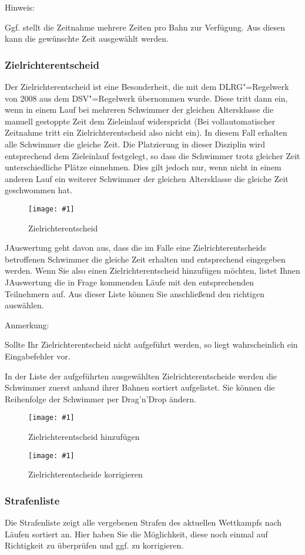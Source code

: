 \documentclass[11pt,a4paper,twoside,ngerman]{article}
\newcommand{\hsmimage}[3]{\begin{figure}[!ht]\centering\texttt{[image: \#1]}\caption{#3}\end{figure}}
\begin{document}
\begin{bfseries}Hinweis:\end{bfseries} Ggf. stellt die Zeitnahme mehrere Zeiten pro Bahn zur Verfügung. Aus diesen kann die gewünschte Zeit ausgewählt werden.


\subsubsection*{Zielrichterentscheid}
\label{lbl:jauswertungmenus:zielrichterentscheid}Der Zielrichterentscheid ist eine Besonderheit, die mit dem DLRG"=Regelwerk von 2008 aus dem DSV"=Regelwerk übernommen wurde. Diese tritt dann ein, wenn in einem Lauf bei mehreren Schwimmer der gleichen Altersklasse die manuell gestoppte Zeit dem Zieleinlauf widerspricht (Bei vollautomatischer Zeitnahme tritt ein Zielrichterentscheid also nicht ein). In diesem Fall erhalten alle Schwimmer die gleiche Zeit. Die Platzierung in dieser Disziplin wird entsprechend dem Zieleinlauf festgelegt, so dass die Schwimmer trotz gleicher Zeit unterschiedliche Plätze einnehmen. Dies gilt jedoch nur, wenn nicht in einem anderen Lauf ein weiterer Schwimmer der gleichen Altersklasse die gleiche Zeit geschwommen hat.


\hsmimage{pics/zielrichterentscheid}{.76\textwidth}{Zielrichterentscheid}
JAuswertung geht davon aus, dass die im Falle eine Zielrichterentscheids betroffenen Schwimmer die gleiche Zeit erhalten und entsprechend eingegeben werden. Wenn Sie also einen Zielrichterentscheid hinzufügen möchten, listet Ihnen JAuswertung die in Frage kommenden Läufe mit den entsprechenden Teilnehmern auf. Aus dieser Liste können Sie anschließend den richtigen auswählen. 

\begin{bfseries}Anmerkung:\end{bfseries} Sollte Ihr Zielrichterentscheid nicht aufgeführt werden, so liegt wahrscheinlich ein Eingabefehler vor.

In der Liste der aufgeführten ausgewählten Zielrichterentscheide werden die Schwimmer zuerst anhand ihrer Bahnen sortiert aufgelistet. Sie können die Reihenfolge der Schwimmer per Drag'n'Drop ändern.


\hsmimage{pics/zielirchterentscheid-add}{.28\textwidth}{Zielrichterentscheid hinzufügen}

\hsmimage{pics/Zielrichterentscheid-korrektur}{.57\textwidth}{Zielrichterentscheide korrigieren}

\subsubsection*{Strafenliste}
Die Strafenliste zeigt alle vergebenen Strafen des aktuellen Wettkampfs nach Läufen sortiert an. Hier haben Sie die Möglichkeit, diese noch einmal auf Richtigkeit zu überprüfen und ggf. zu korrigieren.
\end{document}
